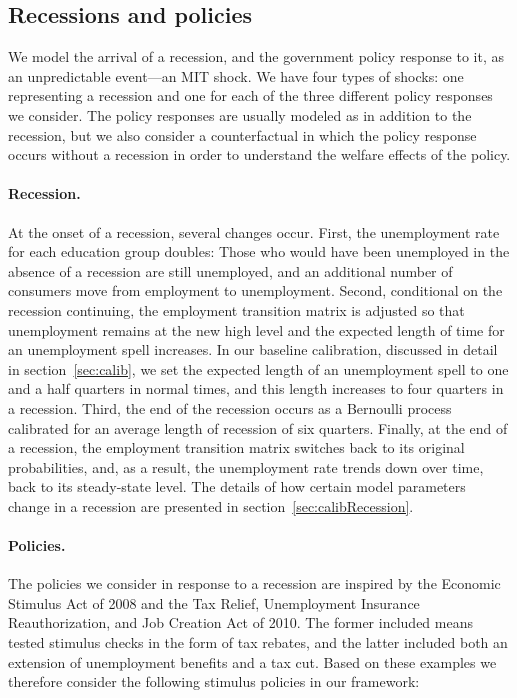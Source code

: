 \documentclass[\PathToRoot/\ProjectName]{subfiles}
\begin{document}
\subsection{Recessions and policies}\whenintegrated{\label{recessions-and-policies}}
\whenintegrated{\label{sec:recessions}} 
We model the arrival of a recession, and the government policy response to it, as an unpredictable event---an MIT shock.
We have four types of shocks: one representing a recession and one for each of the three different policy responses we consider.
The policy responses are usually modeled as in addition to the recession, but we also consider a counterfactual in which the policy response occurs without a recession in order to understand the welfare effects of the policy.

\paragraph{Recession.} At the onset of a recession, several changes occur.
First, the unemployment rate for each education group doubles: Those who would have been unemployed in the absence of a recession are still unemployed, and an additional number of consumers move from employment to unemployment.
Second, conditional on the recession continuing, the employment transition matrix is adjusted so that unemployment remains at the new high level and the expected length of time for an unemployment spell increases.
In our baseline calibration, discussed in detail in section~\ref{sec:calib}, we set the expected length of an unemployment spell to one and a half quarters in normal times, and this length increases to four quarters in a recession.
Third, the end of the recession occurs as a Bernoulli process calibrated for an average length of recession of six quarters.
Finally, at the end of a recession, the employment transition matrix switches back to its original probabilities, and, as a result, the unemployment rate trends down over time, back to its steady-state level.
The details of how certain model parameters change in a recession are presented in section~\ref{sec:calibRecession}.

\paragraph{Policies.} The policies we consider in response to a recession are inspired by the Economic Stimulus Act of 2008 and the Tax Relief, Unemployment Insurance Reauthorization, and Job Creation Act of 2010.
The former included means tested stimulus checks in the form of tax rebates, and the latter included both an extension of unemployment benefits and a tax cut.
Based on these examples we therefore consider the following stimulus policies in our framework:
\end{document}
